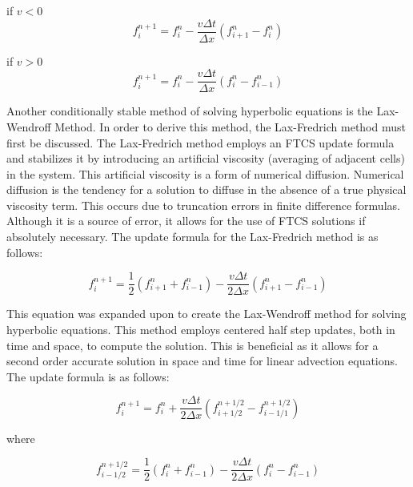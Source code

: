 \documentclass{article}
\begin{document}
      if $v<0$
       $$ f^{n+1}_{i} = f^{n}_{i} - \frac{v\Delta t}{\Delta x}\left(f^{n}_{i+1} - f^{n}_{i}\right)$$
       
       if $v>0$
       $$ f^{n+1}_{i} = f^{n}_{i} - \frac{v\Delta t}{\Delta x}\left(f^{n}_{i} - f^{n}_{i-1}\right)$$
      
      
      
      \bigbreak
      
      Another conditionally stable method of solving hyperbolic equations is the Lax-Wendroff Method. In order to derive this method, the Lax-Fredrich method must first be discussed. The Lax-Fredrich method employs an FTCS update formula and stabilizes it by introducing an artificial viscosity (averaging of adjacent cells) in the system. This artificial viscosity is a form of numerical diffusion. Numerical diffusion is the tendency for a solution to diffuse in the absence of a true physical viscosity term. This occurs due to truncation errors in finite difference formulas. Although it is a source of error, it allows for the use of FTCS solutions if absolutely necessary. The update formula for the Lax-Fredrich method is as follows:
      
      \begin{equation}
      f^{n+1}_{i} = \frac{1}{2} \left(f^{n}_{i+1} + f^{n}_{i-1}\right) - \frac{v\Delta t}{2\Delta x}\left(f^{n}_{i+1} - f^{n}_{i-1}\right)
      \end{equation}
      
      This equation was expanded upon to create the Lax-Wendroff method for solving hyperbolic equations. This method employs centered half step updates, both in time and space, to compute the solution. This is beneficial as it allows for a second order accurate solution in space and time for linear advection equations. The update formula is as follows:
      
      \begin{equation}
      f^{n+1}_{i} = f^{n}_{i} + \frac{v\Delta t}{2\Delta x}\left(f^{n+1/2}_{i+1/2} - f^{n+1/2}_{i-1/1}\right)
      \end{equation}
            
      where
           
      \begin{equation}
      f^{n+1/2}_{i-1/2} = \frac{1}{2} \left(f^{n}_{i} + f^{n}_{i-1}\right) - \frac{v\Delta t}{2\Delta x}\left(f^{n}_{i} - f^{n}_{i-1}\right)
      \end{equation} 
      
\end{document}
